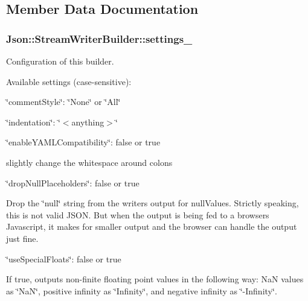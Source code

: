 \subsection{Member Data Documentation}
\subsubsection[{\texorpdfstring{settings\+\_\+}{settings_}}]{ Json\+::\+Stream\+Writer\+Builder\+::settings\+\_\+}\hypertarget{classJson_1_1StreamWriterBuilder_a79bdf2e639a52f4e758c0b95bd1d3423}{}\label{classJson_1_1StreamWriterBuilder_a79bdf2e639a52f4e758c0b95bd1d3423}


Configuration of this builder. 

Available settings (case-\/sensitive)\+:
\begin{DoxyItemize}
\item \char`\"{}comment\+Style\char`\"{}\+: \char`\"{}\+None\char`\"{} or \char`\"{}\+All\char`\"{}
\item \char`\"{}indentation\char`\"{}\+: \char`\"{}$<$anything$>$\char`\"{}
\item \char`\"{}enable\+Y\+A\+M\+L\+Compatibility\char`\"{}\+: false or true
\begin{DoxyItemize}
\item slightly change the whitespace around colons
\end{DoxyItemize}
\item \char`\"{}drop\+Null\+Placeholders\char`\"{}\+: false or true
\begin{DoxyItemize}
\item Drop the \char`\"{}null\char`\"{} string from the writer\textquotesingle{}s output for null\+Values. Strictly speaking, this is not valid J\+S\+ON. But when the output is being fed to a browser\textquotesingle{}s Javascript, it makes for smaller output and the browser can handle the output just fine.
\end{DoxyItemize}
\item \char`\"{}use\+Special\+Floats\char`\"{}\+: false or true
\begin{DoxyItemize}
\item If true, outputs non-\/finite floating point values in the following way\+: NaN values as \char`\"{}\+Na\+N\char`\"{}, positive infinity as \char`\"{}\+Infinity\char`\"{}, and negative infinity as \char`\"{}-\/\+Infinity\char`\"{}.
\end{DoxyItemize}
\end{DoxyItemize}

